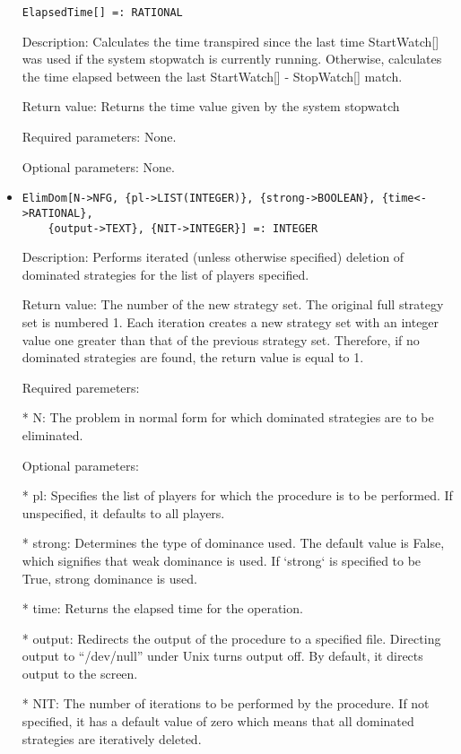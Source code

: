 \begin{itemize}
\begin{verbatim}
ElapsedTime[] =: RATIONAL
\end{verbatim}

\bd
\item
[Description:] Calculates the time transpired since the last time 
StartWatch[] was used if the system stopwatch is currently running.
Otherwise, calculates the time elapsed between the last StartWatch[] -
StopWatch[] match.
\item
[Return value:] Returns the time value given by the system stopwatch
\item
[Required parameters:]  None.
\item   
[Optional parameters:] None.
\ed

\item
\begin{verbatim}
ElimDom[N->NFG, {pl->LIST(INTEGER)}, {strong->BOOLEAN}, {time<->RATIONAL},
	{output->TEXT}, {NIT->INTEGER}] =: INTEGER
\end{verbatim}

\bd
\item
[Description:] Performs iterated (unless otherwise specified) deletion 
of dominated strategies for the list of players specified.  
\item  
[Return value:] The number of the new strategy set.  The original full
strategy set is numbered 1.  Each iteration creates a new strategy set
with an integer value one greater than that of the previous strategy 
set.  Therefore, if no dominated strategies are found, the return value
is equal to 1.
\item
[Required paremeters:]\hfil\null
	
\bd
\item
[* N:] The problem in normal form for which dominated strategies are
to be eliminated.
\ed

\item
[Optional parameters:]\hfil\null

\bd
\item
[* pl:] Specifies the list of players for which the procedure is to
be performed.  If unspecified, it defaults to all players. 
\item
[* strong:] Determines the type of dominance used.  The default value
is False, which signifies that weak dominance is used.  If `strong` 
is specified to be True, strong dominance is used.  
\item
[* time:] Returns the elapsed time for the operation.
\item
[* output:] Redirects the output of the procedure to a specified 
file.  Directing output to ``/dev/null'' under Unix turns 
output off.  By default, it directs output to the screen.
\item
[* NIT:] The number of iterations to be performed by the procedure.
If not specified, it has a default value of zero which means 
that all dominated strategies are iteratively deleted.
\ed
\ed


\end{itemize}
